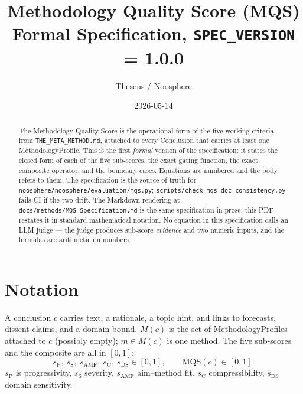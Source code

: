 \documentclass[11pt]{article}
\title{Methodology Quality Score (MQS)\\\large Formal Specification, \texttt{SPEC\_VERSION} = 1.0.0}
\author{Theseus / Noosphere}
\date{2026-05-14}
\newcommand{\sP}{s_{\mathrm{P}}}
\newcommand{\sS}{s_{\mathrm{S}}}
\newcommand{\sAMF}{s_{\mathrm{AMF}}}
\newcommand{\sC}{s_{\mathrm{C}}}
\newcommand{\sDS}{s_{\mathrm{DS}}}
\newcommand{\code}[1]{\texttt{#1}}
\begin{document}
\maketitle

\begin{abstract}
The Methodology Quality Score is the operational form of the five working
criteria from \texttt{THE\_META\_METHOD.md}, attached to every Conclusion that
carries at least one MethodologyProfile. This is the first \emph{formal}
version of the specification: it states the closed form of each of the five
sub-scores, the exact gating function, the exact composite operator, and the
boundary cases. Equations are numbered and the body refers to them. The
specification is the source of truth for \code{noosphere/noosphere/evaluation/mqs.py};
\code{scripts/check\_mqs\_doc\_consistency.py} fails CI if the two drift. The
Markdown rendering at \code{docs/methods/MQS\_Specification.md} is the same
specification in prose; this PDF restates it in standard mathematical
notation. No equation in this specification calls an LLM judge --- the judge
produces sub-score \emph{evidence} and two numeric inputs, and the formulas
are arithmetic on numbers.
\end{abstract}

\section{Notation}
\label{sec:notation}

A conclusion $c$ carries text, a rationale, a topic hint, and links to
forecasts, dissent claims, and a domain bound. $M(c)$ is the set of
MethodologyProfiles attached to $c$ (possibly empty); $m \in M(c)$ is one
method. The five sub-scores and the composite are all in $[0,1]$:
\[
\sP,\ \sS,\ \sAMF,\ \sC,\ \sDS \in [0,1], \qquad \mathrm{MQS}(c) \in [0,1].
\]
$\sP$ is progressivity, $\sS$ severity, $\sAMF$ aim--method fit, $\sC$
compressibility, $\sDS$ domain sensitivity.
\end{document}
